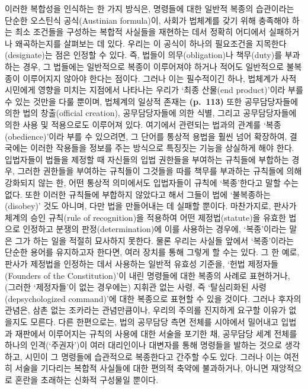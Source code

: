 이러한 복합성을 인식하는 한 가지 방식은, 명령들에 대한 일반적 복종의
습관이라는 단순한 오스틴식 공식(Austinian formula)이, 사회가 법체계를
갖기 위해 충족해야 하는 최소 조건들을 구성하는 복합적 사실들을 재현하는
데서 정확히 어디에서 실패하거나 왜곡하는지를 살펴보는 데 있다. 우리는 이
공식이 하나의 필요조건을 지목한다(designate)는 점은 인정할 수 있다. 즉,
법들이 의무(obligation)나 책무(duty)를 부과하는 경우, 그 법들에는
일반적으로 복종이 이루어져야 하거나 적어도 일반적으로 불복종이
이루어지지 않아야 한다는 점이다. 그러나 이는 필수적이긴 하나, 법체계가
사적 시민에게 영향을 미치는 지점에서 나타나는 우리가 ‘최종 산물(end
product)’이라 부를 수 있는 것만을 다룰 뿐이며, 법체계의 일상적 존재는
\textbf{(p.~113)} 또한 공무담당자들에 의한 법의 창출(official creation),
공무담당자들에 의한 식별, 그리고 공무담당자들에 의한 사용 및 적용으로도
이루어져 있다. 여기에서 관련되는 법과의 관계를 ‘복종(obedience)’이라
부를 수 있으려면, 그 단어를 통상적 용법을 훨씬 넘어 확장하여, 결국에는
이러한 작용들을 정보를 주는 방식으로 특징짓는 기능을 상실하게 해야 한다.
입법자들이 법들을 제정할 때 자신들의 입법 권한들을 부여하는 규칙들에
부합하는 경우, 그러한 권한들을 부여하는 규칙들이 그것들을 따를 책무를
부과하는 규칙들에 의해 강화되지 않는 한, 어떤 통상적 의미에서도
입법자들이 규칙에 ‘복종’한다고 말할 수는 없다. 또한 이러한 규칙들에
부합하지 않았다고 해서 그들이 법에 ‘불복종하는(disobey)’ 것도 아니며,
다만 법을 만들어내는 데 실패할 뿐이다. 마찬가지로, 판사가 체계의 승인
규칙(rule of recognition)을 적용하여 어떤 제정법(statute)을 유효한
법으로 인정하고 분쟁의 판정(determination)에 이를 사용하는 경우에,
‘복종’이라는 말은 그가 하는 일을 적절히 묘사하지 못한다. 물론 우리는
사실들 앞에서 ‘복종’이라는 단순한 용어를 유지하고자 한다면, 여러 장치를
통해 그렇게 할 수는 있다. 그 한 예로, 판사가 제정법을 인정하는 데서
사용하는 일반적 유효성 기준을, ‘헌법 제정자들(Founders of the
Constitution)’이 내린 명령들에 대한 복종의 사례로 표현하거나, (그러한
‘제정자들’이 없는 경우에는) 지휘관 없는 사령, 즉 ‘탈심리화된
사령(depsychologized command)’에 대한 복종으로 표현할 수 있을 것이다.
그러나 후자의 관념은, 삼촌 없는 조카라는 관념만큼이나, 우리의 주의를
진지하게 요구할 이유가 없을지도 모른다. 다른 한편으로는, 법의 공무담당
측면 전체를 시야에서 밀어내고 입법과 재판에서 이루어지는 규칙의 사용에
대한 서술을 포기한 채, 공무담당 세계 전체를 하나의 인격(‘주권자’)이 여러
대리인이나 대변자를 통해 명령들을 발하는 것으로 생각하고, 시민이 그
명령들에 습관적으로 복종한다고 간주할 수도 있다. 그러나 이는 여전히
서술을 기다리는 복합적 사실들에 대한 편의적 축약에 불과하거나, 아니면
재앙적으로 혼란을 초래하는 신화적 구성물일 뿐이다.

